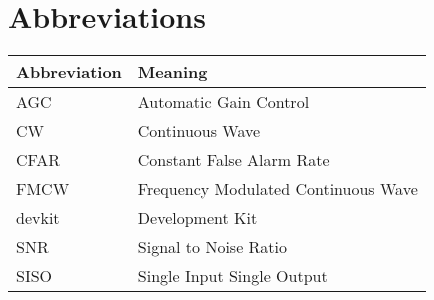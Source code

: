 
\chapter*{Abbreviations}


\begin{center}
  \begin{tabular}{| m{4cm}| m{9cm} | }
    \hline
		\textbf{Abbreviation} & \textbf{Meaning} \\
    \hline
    \hline
		AGC & Automatic Gain Control \\
		CW & Continuous Wave \\
		CFAR & Constant False Alarm Rate \\
		FMCW & Frequency Modulated Continuous Wave \\
		devkit & Development Kit \\
		SNR & Signal to Noise Ratio \\
		SISO & Single Input Single Output \\




    \hline
  \end{tabular}

\end{center}
